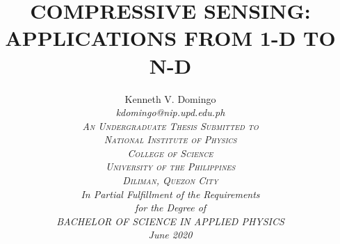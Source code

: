 \documentclass[12pt,oneside]{report}
\begin{document}

\title{
	\Large\uppercase\expandafter{
		Compressive sensing: Applications from 1-D to N-D
	}
}

\author{
	\large\rm\expandafter{
		Kenneth V. Domingo 
	}\\
	\large\itshape\expandafter{
		kdomingo@nip.upd.edu.ph
	}\\
	\vskip0.5in
	\textsc{An Undergraduate Thesis Submitted to}\\
	\textsc{National Institute of Physics}\\
	\textsc{College of Science}\\
	\textsc{University of the Philippines} \\
	\textsc{Diliman, Quezon City}\\
	\vskip0.25in
	\rm In Partial Fulfillment of the Requirements\\
	\rm for the Degree of\\
	\rm\uppercase\expandafter{Bachelor of Science}
	\rm\uppercase{in}
	\rm\uppercase\expandafter{Applied Physics}\\
	\rm\expandafter{June 2020}
}

\maketitle
\thispagestyle{titlestyle}

%

\doublespacing
%

\tableofcontents
\listoftables
\listoffigures

\cleardoublepage
{}


\cleardoublepage
{}












\appendix

\end{document}
